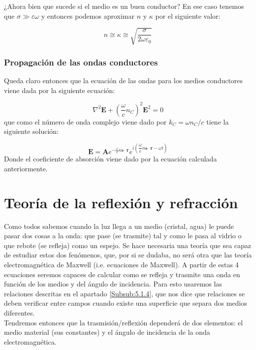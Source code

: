 \documentclass[12pt]{article}
\newcommand{\parentesis}[1]{\left( #1  \right)}
\newcommand{\En}{\mathbf{E}}
\newcommand{\rn}{\mathbf{r}}
\newcommand{\An}{\mathbf{A}}
\newcommand{\sn}{\mathbf{s}}
\numberwithin{equation}{section}
\numberwithin{figure}{section}
\begin{document}
¿Ahora bien que sucede si el medio es un buen conductor? En ese caso tenemos que $\sigma \gg \varepsilon \omega$ y entonces podemos aproximar $n$ y $\kappa$ por el siguiente valor:

\begin{equation}
n \cong \kappa \cong \sqrt{\dfrac{\sigma}{2 \omega \varepsilon_0}}
\end{equation}

\subsubsection{Propagación de las ondas conductores}

Queda claro entonces que la ecuación de las ondas para los medios conductores viene dada por la siguiente ecuación:

\begin{equation}
\nabla^2 \En + \parentesis{\dfrac{\omega}{c}n_C}^2\En^2= 0
\end{equation}
que como el número de onda complejo viene dado por $k_C = \omega n_C / c$ tiene la siguiente solución:

\begin{equation}
\En = \An e^{- \frac{\omega}{c} \kappa \sn \cdot \rn} e^{i \parentesis{\dfrac{\omega}{c} n \sn \cdot \rn - \omega t}}
\end{equation}
Donde el coeficiente de absorción viene dado por la ecuación calculada anteriormente.  \newpage

\section{Teoría de la reflexión y refracción}


Como todos sabemos cuando la luz llega a un medio (cristal, agua) le puede pasar dos cosas a la onda: que pase (se trasmite) tal y como le pasa al vidrio o que rebote (se refleja) como un espejo. Se hace necesaria una teoría que sea capaz de estudiar estos dos fenómenos, que, por si se dudaba, no será otra que las teoría electromagnética de Maxwell (i.e. ecuaciones de Maxwell).
A partir de estas 4 ecuaciones seremos capaces de calcular como se refleja y trasmite una onda en función de los medios y del ángulo de incidencia. Para esto usaremos las relaciones descritas en el apartado \ref{Subsub:5.1.4}, que nos dice que relaciones se deben verificar entre campos cuando existe una superficie que separa dos medios diferentes. \\

Tendremos entonces que la trasmisión/reflexión dependerá de dos elementos: el medio material (sus constantes) y el ángulo de incidencia de la onda electromagnética. 
\end{document}
